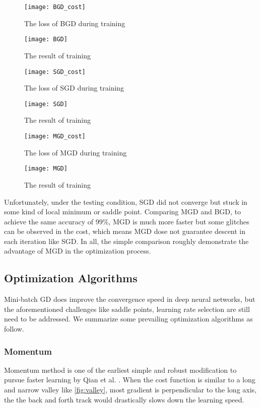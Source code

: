 \begin{figure}[H]
    \centering
    \texttt{[image: BGD\_cost]}
    \caption{\label{fig:BGD_cost}The loss of BGD during training}
\end{figure}

\begin{figure}[H]
    \centering
    \texttt{[image: BGD]}
    \caption{\label{fig:BGD}The result of training}
\end{figure}

\begin{figure}[H]
    \centering
    \texttt{[image: SGD\_cost]}
    \caption{\label{fig:SGD_cost}The loss of SGD during training}
\end{figure}

\begin{figure}[H]
    \centering
    \texttt{[image: SGD]}
    \caption{\label{fig:SGD}The result of training}
\end{figure}

\begin{figure}[H]
    \centering
    \texttt{[image: MGD\_cost]}
    \caption{\label{fig:MGD_cost}The loss of MGD during training}
\end{figure}

\begin{figure}[H]
    \centering
    \texttt{[image: MGD]}
    \caption{\label{fig:MGD}The result of training}
\end{figure}

\par Unfortunately, under the testing condition, SGD did not converge but stuck
in some kind of local minimum or saddle point. Comparing MGD and BGD, to 
achieve the same accuracy of 99\%, MGD is much more faster but some glitches 
can be observed in the cost, which means MGD dose not guarantee descent in each
iteration like SGD. In all, the simple comparison roughly demonstrate the advantage 
of MGD in the optimization process.


\subsection{Optimization Algorithms}
Mini-batch GD does improve the convergence speed in deep neural
networks, but the aforementioned challenges like saddle points,
learning rate selection are still need to be addressed. We 
summarize some prevailing optimization algorithms as follow.

\subsubsection{Momentum}
Momentum method is one of the earliest simple and robust modification to
pursue faster learning by Qian et al. \parencite{qian1999momentum}. 
When the cost function is similar to a long and 
narrow valley like \autoref{fig:valley}, most gradient is perpendicular
to the long axis, the the back and forth track would drastically slows 
down the learning speed. 

